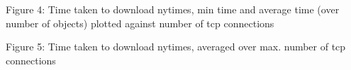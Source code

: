 \documentclass[12pt]{article}
\begin{document}
\hspace*{0.6cm}
{
}
\begin{center}Figure 4: Time taken to download nytimes, min time and average time (over number of objects) plotted against number of tcp connections\end{center}

\hspace*{0.6cm}
{
}
\begin{center}Figure 5: Time taken to download nytimes, averaged over max. number of tcp connections\end{center}
\end{document}
